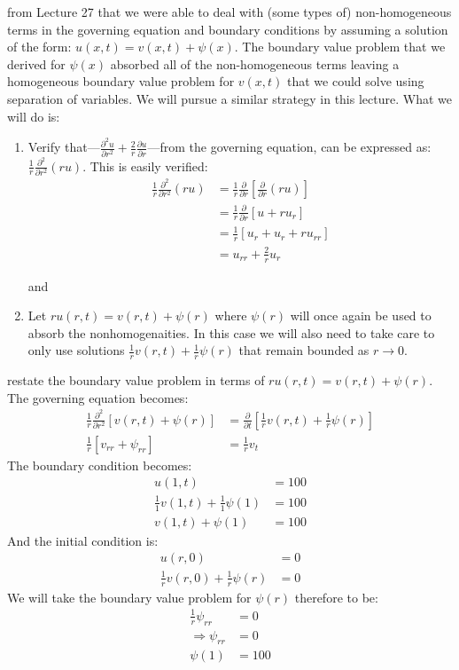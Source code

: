  from Lecture 27 that we were able to deal with (some types of) non-homogeneous terms in the governing equation and boundary conditions by assuming a solution of the form: $u(x,t) = v(x,t) + \psi(x)$.  The boundary value problem that we derived for $\psi(x)$ absorbed all of the non-homogeneous terms leaving a homogeneous boundary value problem for $v(x,t)$ that we could solve using separation of variables.  We will pursue a similar strategy in this lecture. What we will do is:

\begin{enumerate}
\item Verify that---$\frac{\partial^2 u}{\partial r^2} + \frac{2}{r}\frac{\partial u}{\partial r}$---from the governing equation, can be expressed as: $\frac{1}{r}\frac{\partial^2}{\partial r^2}(ru)$.  This is easily verified:
\begin{align*}
\frac{1}{r}\frac{\partial^2}{\partial r^2}(ru) &= \frac{1}{r}\frac{\partial}{\partial r}\left[\frac{\partial}{\partial r}(ru)\right] \\
&= \frac{1}{r}\frac{\partial}{\partial r}\left[u + ru_r\right] \\
&= \frac{1}{r}\left[u_r + u_r + ru_{rr}\right] \\
&= u_{rr} + \frac{2}{r}u_r
\end{align*}

and

\item Let $ru(r,t) = v(r,t) + \psi(r)$ where $\psi(r)$ will once again be used to absorb the nonhomogenaities.  In this case we will also need to take care to only use solutions $\frac{1}{r}v(r,t)+\frac{1}{r}\psi(r)$ that remain bounded as $r \to 0$.
\end{enumerate}

 restate the boundary value problem in terms of $ru(r,t)=v(r,t)+\psi(r)$. The governing equation becomes:
\begin{align*}
\frac{1}{r}\frac{\partial^2}{\partial r^2}\left[v(r,t) + \psi(r)\right] &= \frac{\partial}{\partial t}\left[\frac{1}{r}v(r,t) + \frac{1}{r}\psi(r)\right] \\
\frac{1}{r}\left[v_{rr} + \psi_{rr}\right] &= \frac{1}{r}v_t
\end{align*}
The boundary condition becomes:
\begin{align*}
u(1,t) &= 100 \\
\frac{1}{1}v(1,t) + \frac{1}{1}\psi(1) &= 100 \\
v(1,t) + \psi(1) &= 100
\end{align*} And the initial condition is:
\begin{align*}
u(r,0) &= 0 \\
\frac{1}{r}v(r,0) + \frac{1}{r}\psi(r) &= 0
\end{align*}
We will take the boundary value problem for $\psi(r)$ therefore to be:
\begin{align*}
\frac{1}{r}\psi_{rr} &= 0 \\
\Rightarrow \psi_{rr}&= 0 \\
\psi(1) &= 100
\end{align*}

